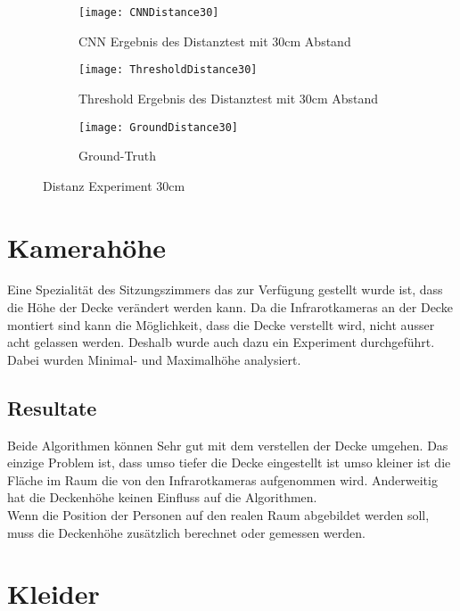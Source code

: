 \begin{figure}[H]
	\begin{subfigure}{.45\linewidth}
		\centering
		\texttt{[image: CNNDistance30]}
		\caption{CNN Ergebnis des Distanztest mit 30cm Abstand}
		\label{fig:cnnDistance30}
	\end{subfigure}\hfill%
	\begin{subfigure}{.45\linewidth}
		\centering
		\texttt{[image: ThresholdDistance30]}
		\caption{Threshold Ergebnis des Distanztest mit 30cm Abstand}
		\label{fig:thresholdDistance30}
	\end{subfigure}
	\begin{subfigure}{\linewidth}
		\centering
		\texttt{[image: GroundDistance30]}
		\caption{Ground-Truth}
		\label{fig:groundDistance30}
	\end{subfigure}
	\caption{Distanz Experiment 30cm}
	\label{fig:Distance30}
\end{figure}

\section{Kamerahöhe}
\label{sec:cameraHeight}
Eine Spezialität des Sitzungszimmers das zur Verfügung gestellt wurde ist, dass die Höhe der Decke verändert werden kann. Da die Infrarotkameras an der Decke montiert sind kann die Möglichkeit, dass die Decke verstellt wird, nicht ausser acht gelassen werden. Deshalb wurde auch dazu ein Experiment durchgeführt. Dabei wurden Minimal- und Maximalhöhe analysiert.

\subsection{Resultate}
Beide Algorithmen können Sehr gut mit dem verstellen der Decke umgehen. Das einzige Problem ist, dass umso tiefer die Decke eingestellt ist umso kleiner ist die Fläche im Raum die von den Infrarotkameras aufgenommen wird. Anderweitig hat die Deckenhöhe keinen Einfluss auf die Algorithmen.\\
Wenn die Position der Personen auf den realen Raum abgebildet werden soll, muss die Deckenhöhe zusätzlich berechnet oder gemessen werden.


\section{Kleider}
\label{sec:cloths}

